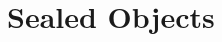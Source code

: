 \documentclass[main.tex]{subfiles}
\begin{document}
\onlyinsubfile{\mainmatter{}}

\chapter{Sealed Objects}


\biblio{}
\onlyinsubfile{\glsaddall\printglossaries}
\end{document}
